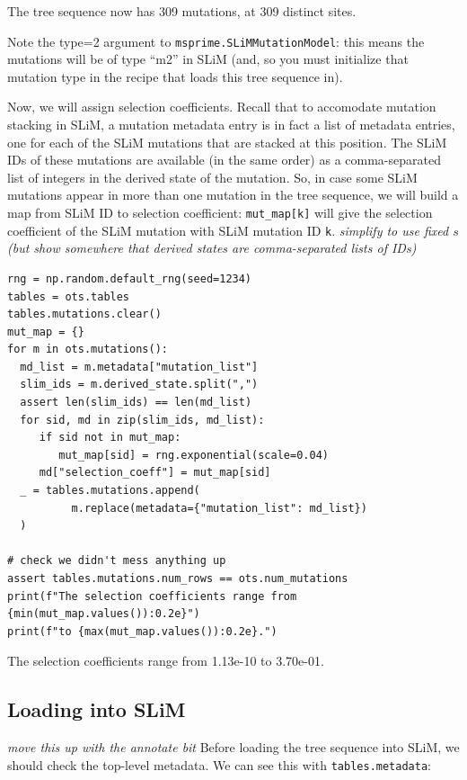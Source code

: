 \documentclass[12pt]{article}
\newcommand{\comment}[1]{\textit{\color{green} #1}}
\begin{document}
\begin{pycon}
The tree sequence now has 309 mutations, at 309 distinct sites.
\end{pycon}

Note the type=2 argument to \verb|msprime.SLiMMutationModel|:
this means the mutations will be of type “m2” in SLiM
(and, so you must initialize that mutation type in the recipe that loads this tree sequence in).

Now, we will assign selection coefficients.
Recall that to accomodate mutation stacking in SLiM,
a mutation metadata entry is in fact a list of metadata entries,
one for each of the SLiM mutations that are stacked at this position.
The SLiM IDs of these mutations are available (in the same order) as a comma-separated list of integers in the derived state of the mutation.
So, in case some SLiM mutations appear in more than one mutation in the tree sequence,
we will build a map from SLiM ID to selection coefficient:
\verb|mut_map[k]| will give the selection coefficient of the SLiM mutation with SLiM mutation ID \verb|k|.
\comment{simplify to use fixed $s$ (but show somewhere that derived states are comma-separated lists of IDs)}

\begin{listing}[H]
    \begin{verbatim}
rng = np.random.default_rng(seed=1234)
tables = ots.tables
tables.mutations.clear()
mut_map = {}
for m in ots.mutations():
  md_list = m.metadata["mutation_list"]
  slim_ids = m.derived_state.split(",")
  assert len(slim_ids) == len(md_list)
  for sid, md in zip(slim_ids, md_list):
     if sid not in mut_map:
        mut_map[sid] = rng.exponential(scale=0.04)
     md["selection_coeff"] = mut_map[sid]
  _ = tables.mutations.append(
          m.replace(metadata={"mutation_list": md_list})
  )

# check we didn't mess anything up
assert tables.mutations.num_rows == ots.num_mutations
print(f"The selection coefficients range from {min(mut_map.values()):0.2e}")
print(f"to {max(mut_map.values()):0.2e}.")
  \end{verbatim}
\end{listing}
\begin{pycon}
The selection coefficients range from 1.13e-10 to 3.70e-01.
\end{pycon}

\subsection*{Loading into SLiM}
\comment{move this up with the annotate bit}
Before loading the tree sequence into SLiM,
we should check the top-level metadata.
We can see this with \verb|tables.metadata|:
\end{document}
